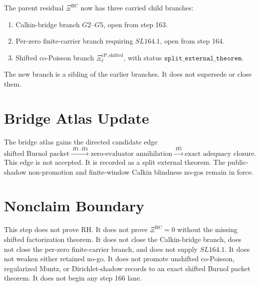 \documentclass[11pt]{article}
\newcommand{\XiBC}{\Xi^{\mathrm{BC}}}
\newcommand{\Xicp}{\Xi^{\mathrm{cP,shifted}}_{\ell}}
\begin{document}
The parent residual \(\XiBC\) now has three carried child branches:
\begin{enumerate}[label=\arabic*.]
\item Calkin-bridge branch \(G2\)--\(G5\), open from step 163.
\item Per-zero finite-carrier branch requiring \(SL164.1\), open from step 164.
\item Shifted co-Poisson branch \(\Xicp\), with status
  \(\texttt{split\_external\_theorem}\).
\end{enumerate}
The new branch is a sibling of the earlier branches. It does not supersede or
close them.

\section*{Bridge Atlas Update}

The bridge atlas gains the directed candidate edge
\[
  \text{shifted Burnol packet}
  \xrightarrow{\ H1\text{--}H4\ }
  \text{zero-evaluator annihilation}
  \xrightarrow{\ H5\ }
  \text{exact adequacy closure}.
\]
This edge is not accepted. It is recorded as a split external theorem. The
public-shadow non-promotion and finite-window Calkin blindness no-gos remain in
force.

\section*{Nonclaim Boundary}

This step does not prove RH. It does not prove \(\XiBC=0\) without the missing
shifted factorization theorem. It does not close the Calkin-bridge branch, does
not close the per-zero finite-carrier branch, and does not supply \(SL164.1\).
It does not weaken either retained no-go. It does not promote unshifted
co-Poisson, regularized Muntz, or Dirichlet-shadow records to an exact shifted
Burnol packet theorem. It does not begin any step 166 lane.
\end{document}
